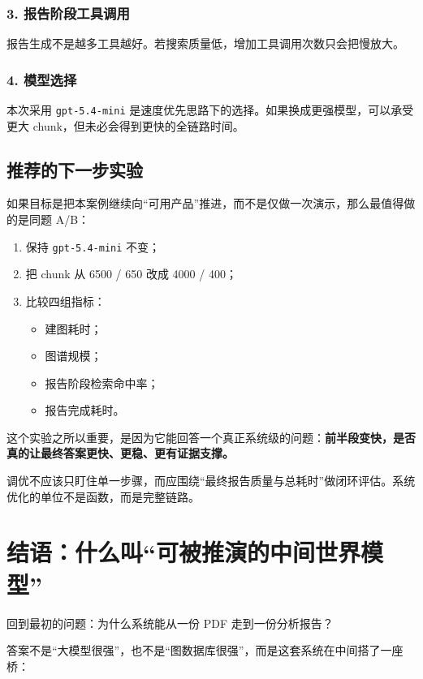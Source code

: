 \documentclass[UTF8,10pt,oneside]{ctexbook}
\newcommand{\code}[1]{\nolinkurl{#1}}
\begin{document}
\subsection*{3. 报告阶段工具调用}
报告生成不是越多工具越好。若搜索质量低，增加工具调用次数只会把慢放大。

\subsection*{4. 模型选择}
本次采用 \code{gpt-5.4-mini} 是速度优先思路下的选择。如果换成更强模型，可以承受更大 chunk，但未必会得到更快的全链路时间。

\section{推荐的下一步实验}

如果目标是把本案例继续向“可用产品”推进，而不是仅做一次演示，那么最值得做的是同题 A/B：

\begin{enumerate}
  \item 保持 \code{gpt-5.4-mini} 不变；
  \item 把 chunk 从 6500 / 650 改成 4000 / 400；
  \item 比较四组指标：
    \begin{itemize}
      \item 建图耗时；
      \item 图谱规模；
      \item 报告阶段检索命中率；
      \item 报告完成耗时。
    \end{itemize}
\end{enumerate}

这个实验之所以重要，是因为它能回答一个真正系统级的问题：\textbf{前半段变快，是否真的让最终答案更快、更稳、更有证据支撑。}

\begin{takeawaybox}[本章核心结论]
调优不应该只盯住单一步骤，而应围绕“最终报告质量与总耗时”做闭环评估。系统优化的单位不是函数，而是完整链路。
\end{takeawaybox}

\chapter{结语：什么叫“可被推演的中间世界模型”}

回到最初的问题：为什么系统能从一份 PDF 走到一份分析报告？

答案不是“大模型很强”，也不是“图数据库很强”，而是这套系统在中间搭了一座桥：
\end{document}
